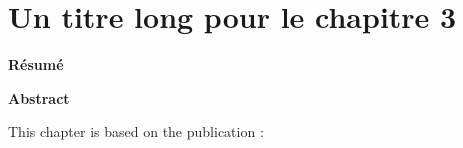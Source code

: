 \ifdefined{}
\else
\setcounter{chapter}{2} %
\dominitoc
\faketableofcontents
\fi

\chapter{Un titre long pour le chapitre 3}
\label{chap:3}


\textbf{Résumé}

\textbf{Abstract}

\begin{cit}
    This chapter is based on the publication \cite{}:
\end{cit}


\clearpage
\minitoc


